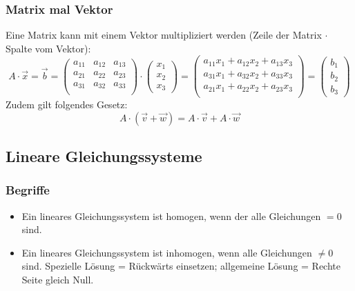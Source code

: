 \subsubsection{Matrix mal Vektor}
Eine Matrix kann mit einem Vektor multipliziert werden (Zeile der Matrix $\cdot$
Spalte vom Vektor):
\[ A \cdot \vec x = \vec b = \begin {pmatrix}
  a_{11} & a_{12} & a_{13} \\
  a_{21} & a_{22} & a_{23} \\
  a_{31} & a_{32} & a_{33} \\
\end {pmatrix} \cdot
  \left( \begin {array} {c} x_1 \\ x_2 \\ x_3 \end {array} \right) = 
  \left( \begin {array} {c}
            a_{11}x_1 + a_{12}x_2 + a_{13}x_3 \\
            a_{31}x_1 + a_{32}x_2 + a_{33}x_3 \\
            a_{21}x_1 + a_{22}x_2 + a_{23}x_3 \\
         \end {array}
  \right) =
  \left( \begin {array} {c} b_1 \\ b_2 \\ b_3 \end {array} \right)
     \]
Zudem gilt folgendes Gesetz:
\[ A \cdot (\vec v + \vec w) = A \cdot \vec v + A \cdot \vec w \]

\subsection{Lineare Gleichungssysteme}
\subsubsection{Begriffe}
\begin{itemize}
  \item Ein lineares Gleichungssystem ist homogen, wenn der alle
  Gleichungen $= 0$ sind.
  \item Ein lineares Gleichungssystem ist inhomogen, wenn alle
  Gleichungen $\ne 0$ sind. Spezielle Lösung = Rückwärts einsetzen;
  allgemeine Lösung = Rechte Seite gleich Null.
\end{itemize}

